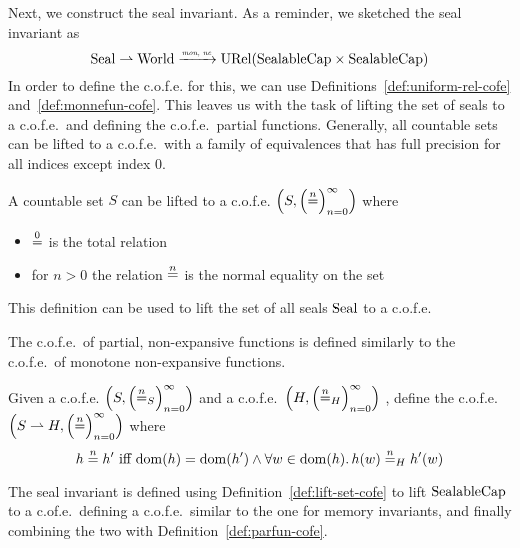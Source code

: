 \begin{jversion}
Next, we construct the seal invariant.
As a reminder, we sketched the seal invariant as
\[
  \Seal \parfun \World \monnefun \URel{\SealableCaps\times\SealableCaps}
\]
In order to define the c.o.f.e. for this, we can use Definitions~\ref{def:uniform-rel-cofe} and~\ref{def:monnefun-cofe}.
This leaves us with the task of lifting the set of seals to a c.o.f.e.\ and defining the c.o.f.e.\ partial functions.
Generally, all countable sets can be lifted to a c.o.f.e.\ with a family of equivalences that has full precision for all indices except index 0.
\begin{definition}[Sets to c.o.f.e.]
  \label{def:lift-set-cofe}
  A countable set $S$ can be lifted to a c.o.f.e. $\cofe{S}$ where
  \begin{itemize}
  \item $\nequal[0]$ is the total relation
  \item for $n > 0$ the relation $\nequal$ is the normal equality on the set
  \end{itemize}
\end{definition}
This definition can be used to lift the set of all seals $\Seal$ to a c.o.f.e.

The c.o.f.e.\ of partial, non-expansive functions is defined similarly to the c.o.f.e.\ of monotone non-expansive functions.
\begin{definition}
\label{def:parfun-cofe}
  Given a c.o.f.e. $\left(S,\left(\nequal[n]_S\right)_{n=0}^{\infty}\right)$ and a c.o.f.e.\ $\left(H,\left(\nequal[n]_H\right)_{n=0}^{\infty}\right)$ , define the c.o.f.e.\ $\left(S \parfun H,\left(\nequal[n]\right)_{n=0}^{\infty} \right)$ where 
  \[
    h \nequal h' \text{ iff } \dom(h) = \dom(h') \wedge \forall w \in \dom(h) \ldotp h(w) \nequal_H h'(w)
  \]
\end{definition}
The seal invariant is defined using Definition~\ref{def:lift-set-cofe} to lift $\SealableCaps$ to a c.of.e.\, defining a c.o.f.e.\ similar to the one for memory invariants, and finally combining the two with Definition~\ref{def:parfun-cofe}.


\end{jversion}
